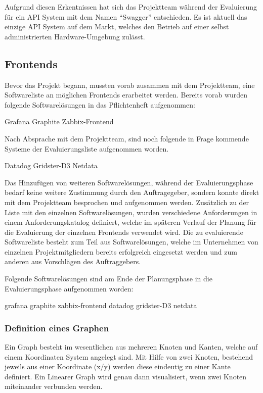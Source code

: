 Aufgrund diesen Erkentnissen hat sich das Projektteam während der Evaluierung
für ein API System mit dem Namen ``Swagger'' entschieden. Es ist aktuell das
einzige API System auf dem Markt, welches den Betrieb auf einer selbst
administrierten Hardware-Umgebung zulässt.
\nl%

\subsection{Frontends}
\label{subsec:frontends}
Bevor das Projekt begann, mussten vorab zusammen mit dem Projektteam, eine
Softwareliste an möglichen Frontends erarbeitet werden. Bereits vorab wurden
folgende Softwarelösungen in das Pflichtenheft aufgenommen:

\begin{outline}
  \1 Grafana
  \1 Graphite
  \1 Zabbix-Frontend
\end{outline}

Nach Absprache mit dem Projektteam, sind noch folgende in Frage kommende
Systeme der Evaluierungsliste aufgenommen worden.

\begin{outline}
  \1 Datadog
  \1 Gridster-D3
  \1 Netdata
\end{outline}

Das Hinzufügen von weiteren Softwarelösungen, während der Evaluierungsphase
bedarf keine weitere Zustimmung durch den Auftragegeber, sondern konnte direkt
mit dem Projektteam besprochen und aufgenommen werden. Zusätzlich zu der Liste
mit den einzelnen Softwarelösungen, wurden verschiedene Anforderungen in einem
Anforderungskatalog definiert, welche im späteren Verlauf der Planung für die
Evaluierung der einzelnen Frontends verwendet wird. Die zu evaluierende
Softwareliste besteht zum Teil aus Softwarelösungen, welche im Unternehmen von
einzelnen Projektmitgliedern bereits erfolgreich eingesetzt werden und zum
anderen aus Vorschlägen des Auftraggebers.


Folgende Softwarelösungen sind am Ende der Planungsphase in die
Evaluierungsphase aufgenommen worden:

\begin{outline}
  \1 grafana
  \1 graphite
  \1 zabbix-frontend
  \1 datadog
  \1 gridster-D3
  \1 netdata
\end{outline}
\mr%

\subsubsection{Definition eines Graphen}
\label{definition_eines_graphen}
Ein Graph besteht im wesentlichen aus mehreren Knoten und Kanten, welche auf
einem Koordinaten System angelegt sind. Mit Hilfe von zwei Knoten, bestehend
jeweils aus einer Koordinate (x/y) werden diese eindeutig zu einer Kante
definiert. Ein Linearer Graph wird genau dann visualisiert, wenn zwei Knoten
miteinander verbunden werden.

